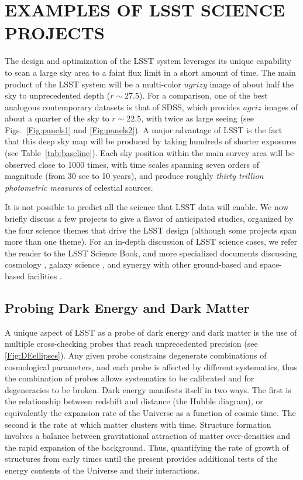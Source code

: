 
\section{EXAMPLES OF LSST SCIENCE PROJECTS}
\label{Sec:science}

The design and optimization of the LSST system leverages its unique capability
to scan a large sky area to a faint flux limit in a short amount of time.
The main product of the LSST system will be a multi-color $ugrizy$ image of about
half the sky to unprecedented depth ($r\sim27.5$). For a comparison,
one of the best
analogous contemporary datasets is that of SDSS, which provides $ugriz$ images
of about a quarter of the sky to $r\sim22.5$, with twice as large seeing
(see Figs.~\ref{Fig:panels1} and \ref{Fig:panels2}). A major advantage of LSST
is the fact that this deep sky map will be produced by taking hundreds of
shorter exposures (see Table~\ref{tab:baseline}). Each sky position within the main survey area
will be observed close to 1000 times, with time scales spanning seven orders of
magnitude (from 30 sec to 10 years), and produce roughly \textit{thirty
trillion photometric measures} of celestial sources.

It is not possible to predict all the science that LSST data will enable.
We now briefly discuss a few projects to give a flavor of anticipated studies,
organized by the four science themes that drive the LSST design
(although some projects span more than one theme).
For an in-depth discussion of LSST science cases, we refer the reader to the
LSST Science Book, and more specialized documents discussing cosmology
\citep{2012arXiv1211.0310L, 2018RPPh...81f6901Z}, galaxy science
\citep{2017arXiv170801617R}, and synergy with other ground-based and
space-based facilities
\citep{2016arXiv161001661N,2015arXiv150107897J,2017ApJS..233...21R}.

\subsection{Probing Dark Energy and Dark Matter }

A unique aspect of LSST as a probe of dark energy and dark matter is
the use of multiple cross-checking probes that reach unprecedented
precision (see \autoref{Fig:DEellipses}). Any given probe constrains
degenerate combinations of cosmological parameters, and each probe is
affected by different systematics, thus the combination of probes
allows systematics to be calibrated and for degeneracies to be
broken.  Dark energy manifests itself in two ways.  The first is the
relationship between redshift and distance (the Hubble diagram), or
equivalently the expansion rate of the Universe as a function of
cosmic time.  The second is the rate at which matter clusters with
time.
Structure formation involves a balance between
gravitational attraction of matter over-densities and the rapid
expansion of the background.  Thus, quantifying the rate of growth of
structures from early times until the present provides additional
tests of the energy contents of the Universe and their interactions.

